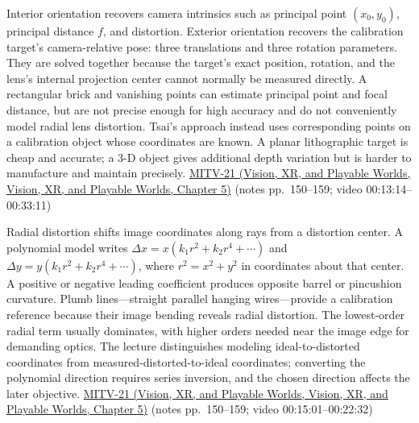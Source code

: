 Interior orientation recovers camera intrinsics such as principal point \((x_0,y_0)\), principal distance \(f\), and distortion. Exterior orientation recovers the calibration target's camera-relative pose: three translations and three rotation parameters. They are solved together because the target's exact position, rotation, and the lens's internal projection center cannot normally be measured directly. A rectangular brick and vanishing points can estimate principal point and focal distance, but are not precise enough for high accuracy and do not conveniently model radial lens distortion. Tsai's approach instead uses corresponding points on a calibration object whose coordinates are known. A planar lithographic target is cheap and accurate; a 3-D object gives additional depth variation but is harder to manufacture and maintain precisely. \href{../07-Vision-XR-and-Playable-Worlds/main.pdf\#nameddest=04-visual-computing-ii-ch036-mitv-21---relative-orientation-binocular-stereo-structure-quadrics-calibration-reprojection}{MITV-21 (Vision, XR, and Playable Worlds, Vision, XR, and Playable Worlds, Chapter 5)} (notes pp.~150--159; video 00:13:14--00:33:11)

Radial distortion shifts image coordinates along rays from a distortion center. A polynomial model writes \(\Delta x=x(k_1r^2+k_2r^4+\cdots)\) and \(\Delta y=y(k_1r^2+k_2r^4+\cdots)\), where \(r^2=x^2+y^2\) in coordinates about that center. A positive or negative leading coefficient produces opposite barrel or pincushion curvature. Plumb lines---straight parallel hanging wires---provide a calibration reference because their image bending reveals radial distortion. The lowest-order radial term usually dominates, with higher orders needed near the image edge for demanding optics. The lecture distinguishes modeling ideal-to-distorted coordinates from measured-distorted-to-ideal coordinates; converting the polynomial direction requires series inversion, and the chosen direction affects the later objective. \href{../07-Vision-XR-and-Playable-Worlds/main.pdf\#nameddest=04-visual-computing-ii-ch036-mitv-21---relative-orientation-binocular-stereo-structure-quadrics-calibration-reprojection}{MITV-21 (Vision, XR, and Playable Worlds, Vision, XR, and Playable Worlds, Chapter 5)} (notes pp.~150--159; video 00:15:01--00:22:32)

